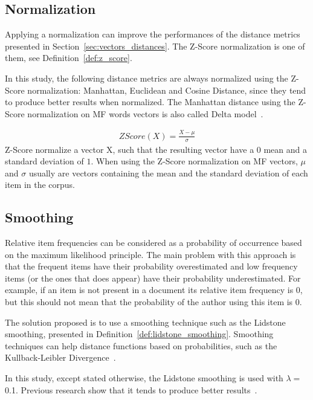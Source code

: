 \subsection{Normalization \label{sec:normalization}}

Applying a normalization can improve the performances of the distance metrics presented in Section~\ref{sec:vectors_distances}.
The Z-Score normalization is one of them, see Definition~\ref{def:z_score}.

In this study, the following distance metrics are always normalized using the Z-Score normalization: Manhattan, Euclidean and Cosine Distance, since they tend to produce better results when normalized.
The Manhattan distance using the Z-Score normalization on MF words vectors is also called Delta model~\cite{savoy_stylo}.

\begin{definition}
  \label{def:z_score}
  \begin{gather*}
    ZScore(X) = \frac{X - \mu}{\sigma}
  \end{gather*}
  Z-Score normalize a vector X, such that the resulting vector have a $0$ mean and a standard deviation of $1$.
  When using the Z-Score normalization on MF vectors, $\mu$ and $\sigma$ usually are vectors containing the mean and the standard deviation of each item in the corpus.
\end{definition}

\subsection{Smoothing}

Relative item frequencies can be considered as a probability of occurrence based on the maximum likelihood principle.
The main problem with this approach is that the frequent items have their probability overestimated and low frequency items (or the ones that does appear) have their probability underestimated.
For example, if an item is not present in a document its relative item frequency is 0, but this should not mean that the probability of the author using this item is 0.

The solution proposed is to use a smoothing technique such as the Lidstone smoothing, presented in Definition~\ref{def:lidstone_smoothing}.
Smoothing techniques can help distance functions based on probabilities, such as the Kullback-Leibler Divergence~\cite{savoy_stylo}.

In this study, except stated otherwise, the Lidstone smoothing is used with $\lambda = $0.1.
Previous research show that it tends to produce better results~\cite{savoy_stylo}.


